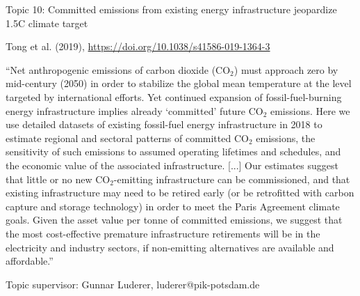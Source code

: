 \documentclass[10pt,aspectratio=169,dvipsnames]{beamer}
\begin{document}
\begin{frame}
  \begin{block}{Topic 10: Committed emissions from existing energy infrastructure jeopardize 1.5\degree\hspace{0pt}C climate target}
      
    Tong et al. (2019), \href{https://doi.org/10.1038/s41586-019-1364-3}{https://doi.org/10.1038/s41586-019-1364-3}
    
    \enquote{Net anthropogenic emissions of carbon dioxide (CO$_2$) must approach zero by mid-century (2050) in order to stabilize the global mean temperature at the level targeted by international efforts. Yet continued expansion of fossil-fuel-burning energy infrastructure implies already ‘committed’ future CO$_2$ emissions. Here we use detailed datasets of existing fossil-fuel energy infrastructure in 2018 to estimate regional and sectoral patterns of committed CO$_2$ emissions, the sensitivity of such emissions to assumed operating lifetimes and schedules, and the economic value of the associated infrastructure. [...] Our estimates suggest that little or no new CO$_2$-emitting infrastructure can be commissioned, and that existing infrastructure may need to be retired early (or be retrofitted with carbon capture and storage technology) in order to meet the Paris Agreement climate goals. Given the asset value per tonne of committed emissions, we suggest that the most cost-effective premature infrastructure retirements will be in the electricity and industry sectors, if non-emitting alternatives are available and affordable.}

    \hfill
    Topic supervisor: Gunnar Luderer, luderer@pik-potsdam.de
    
  \end{block}
\end{frame}
\end{document}
